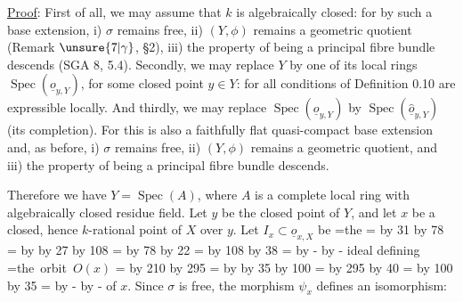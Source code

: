 \uline{Proof}: First of all, we may assume that $k$ is algebraically closed: for by such a base extension, i) $\sigma$ remains free, ii) $(Y,\phi)$ remains a geometric quotient (Remark $\unsure{7|\gamma}$, \S2), iii) the property of being a principal fibre bundle descends (SGA 8, 5.4). Secondly, we may replace $Y$ by one of its local rings $\operatorname{Spec}(\underline{o}_{y,Y})$, for some closed point $y\in Y$: for all conditions of Definition 0.10 are expressible locally. And thirdly, we may replace $\operatorname{Spec}(\underline{o}_{y,Y})$ by $\operatorname{Spec}(\hat{\underline{o}}_{y,Y})$ (its completion). For this is also a faithfully flat quasi-compact base extension and, as before, i) $\sigma$ remains free, ii) $(Y,\phi)$ remains a geometric quotient, and iii) the property of being a principal fibre bundle descends.

Therefore we have $Y=\operatorname{Spec}(A)$, where $A$ is a complete local ring with algebraically closed residue field. Let $y$ be the closed point of $Y$, and let $x$ be a closed, hence $k$-rational point of $X$ over $y$. Let $I_x\subset\underline{o}_{x,X}$ be
\begingroup
{}=\hbox{the}
= \divide{} by 31 \multiply{} by 78
= \advance{} by  \divide{} by 27 \multiply{} by 108
= \divide{} by 78 \multiply{} by 22
= \divide{} by 108 \multiply{} by 38
= \advance{} by - \advance{} by -
\leavevmode{}%
\kern{}\kern{}\endgroup
ideal defining
\begingroup
{}=\hbox{the orbit $O(x)$}
= \divide{} by 210 \multiply{} by 295
= \advance{} by  \divide{} by 35 \multiply{} by 100
= \divide{} by 295 \multiply{} by 40
= \divide{} by 100 \multiply{} by 35
= \advance{} by - \advance{} by -
\leavevmode{}%
\kern{}\kern{}\endgroup
of $x$. Since $\sigma$ is free, the morphism $\psi_x$ defines an isomorphism:

